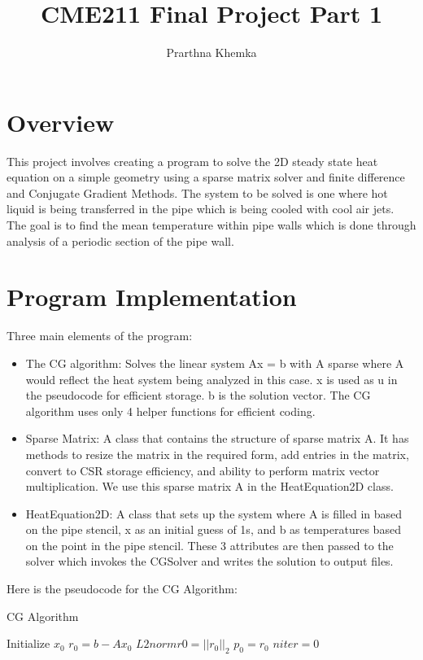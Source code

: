 \documentclass{article}
\title{CME211 Final Project Part 1}
\author{Prarthna Khemka}
\begin{document}
\maketitle

\section{Overview}
This project involves creating a program to solve the 2D steady state heat
equation on a simple geometry using a sparse matrix solver and finite
difference and Conjugate Gradient Methods. The system to be solved is one
where hot liquid is being transferred in the pipe which is being cooled with
cool air jets. The goal is to find the mean temperature within pipe walls
which is done through analysis of a periodic section of the pipe wall. 

\section{Program Implementation}
Three main elements of the program:
\begin{itemize}
\item The CG algorithm:
  Solves the linear system Ax = b with A sparse where A would reflect
  the heat system being analyzed in this case. x is used as u in the
  pseudocode for efficient storage. b is the solution vector. The CG
  algorithm uses only 4 helper functions for efficient coding. 
\item Sparse Matrix:
  A class that contains the structure of sparse matrix A. It has methods
  to resize the matrix in the required form, add entries in the matrix,
  convert to CSR storage efficiency, and ability to perform matrix vector
  multiplication. We use this sparse matrix A in the HeatEquation2D class.
\item HeatEquation2D:
  A class that sets up the system where A is filled in based on the pipe
  stencil, x as an initial guess of 1s, and b as temperatures based on the
  point in the pipe stencil. These 3 attributes are then passed to the
  solver which invokes the CGSolver and writes the solution to output files.
\end{itemize}
Here is the pseudocode for the CG Algorithm:

\begin{algorithm}[H]
  \caption{CG Algorithm}
  \SetAlgoLined
  Initialize {$x_0$}\;
  $r_0 = b - Ax_0$\;
  $L2normr0 = ||r_0||_2$\;
  $p_0 = r_0$\;
  $niter = 0$\;
  
\end{algorithm}
\end{document}
